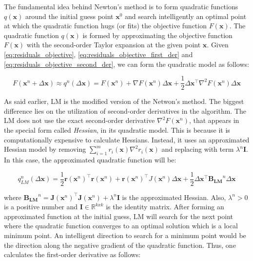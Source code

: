 \documentclass[12pt]{report}
\numberwithin{figure}{section}
\newcommand{\R}{\mathbb{R}}
\begin{document}
\begin{appendices}
The fundamental idea behind Newton's method is to form quadratic functions 
$q(\mathbf{x})$ 
around the initial guess point $\mathbf{x}^0$ and search intelligently an optimal point at which 
the quadratic function hugs (or fits) the objective function $F(\mathbf{x})$. 
The quadratic function $q(\mathbf{x})$ is formed by approximating the objective function $F(\mathbf{x})$ 
with the second-order Taylor expansion at the given point $\mathbf{x}$.
Given 
\eqref{eq:residuals_objective}, 
\eqref{eq:residuals_objective_first_der} and 
\eqref{eq:residuals_objective_second_der}, 
we can form the quadratic model as follows:

\begin{equation}
  F(\mathbf{x}^n + \Delta \mathbf{x}) \approx
  q^n(\Delta \mathbf{x}) = 
  F(\mathbf{x}^n) + 
  \nabla F(\mathbf{x}^n) \Delta \mathbf{x} + 
  \frac{1}{2}\Delta \mathbf{x}^\top \nabla^2 F(\mathbf{x}^n) \Delta 
  \mathbf{x}
\end{equation}


As said earlier, LM is the modified version of the Netwon's method. 
The biggest difference lies on the utilization of second-order derivatives 
in the algorithm. 
The LM does not use the exact 
second-order derivative $\nabla^2F(\mathbf{x}^n)$, that appears in the special form called \textit{Hessian}, 
in its quadratic model. 
This is because it is computationally expensive to calculate Hessians. 
Instead, it uses an approximated 
Hessian model by removing $\sum_{i=1}^mr_i(\mathbf{x})\nabla^2r_i(\mathbf{x})$ 
and replacing with 
term $\lambda^n \mathbf{I}$. In this case, the approximated quadratic function will be:

\begin{equation}
  q_{LM}^n(\Delta \mathbf{x}) = 
  \frac{1}{2}\mathbf{r}(\mathbf{x}^n)^\top\mathbf{r}(\mathbf{x}^n) + 
  \mathbf{r}(\mathbf{x}^n)^\top J(\mathbf{x}^n)\Delta \mathbf{x} + 
  \frac{1}{2}\Delta \mathbf{x}^\top\mathbf{B_{LM}}^n\Delta \mathbf{x}
\end{equation}

where 
$
\mathbf{B_{LM}}^n = \mathbf{J}(\mathbf{x}^n)^\top 
\mathbf{J}(\mathbf{x}^n) + 
\lambda^n \mathbf{I}
$ 
is the approximated Hessian. Also, 
$\lambda^n>0$ is a positive number and $\mathbf{I}\in \R^{kxk}$ is the identity matrix.
After forming an approximated function at the initial guess, LM 
will search for the next point where the quadratic function converges to an  
optimal solution which is a local minimum point. An intelligent direction  
to search for a minimum point would be the direction along  
the negative gradient of the quadratic function. 
Thus, one calculates the first-order derivative as follows:


\end{appendices}
\end{document}
